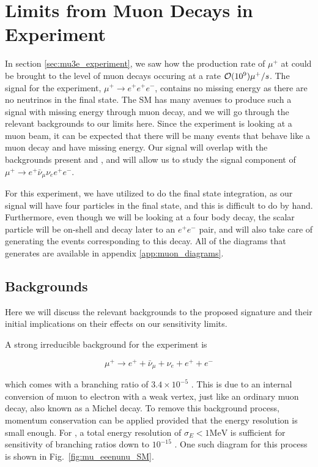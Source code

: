 \section{Limits from Muon Decays in \mueee Experiment}
In section \ref{sec:mu3e_experiment}, we saw how the production rate of $\mu^+$ at \mueee could be brought to the level of muon decays occuring at a rate $\operatorname{\mathcal{O}}(10^9) \mu^+/s$.
The signal for the \mueee experiment, $\mu^+ \rightarrow e^+ e^+ e^-$, contains no missing energy as there are no neutrinos in the final state.
The SM has many avenues to produce such a signal with missing energy through muon decay, and we will go through the relevant backgrounds to our limits here.
Since the experiment is looking at a muon beam, it can be expected that there will be many events that behave like a muon decay and have missing energy.
Our signal will overlap with the backgrounds present and \mueee, and will allow us to study the signal component of $\mu^+ \rightarrow e^+ \bar{\nu}_\mu \nu_e e^+ e^-$.

For this experiment, we have utilized \madgraph to do the final state integration, as our signal will have four particles in the final state, and this is difficult to do by hand.
Furthermore, even though we will be looking at a four body decay, the scalar particle will be on-shell and decay later to an $e^+ e^-$ pair, and \madgraph will also take care of generating the events corresponding to this decay.
All of the diagrams that \madgraph generates are available in appendix \ref{app:muon_diagrams}.

\subsection{Backgrounds}
Here we will discuss the relevant backgrounds to the proposed signature and their initial implications on their effects on our sensitivity limits.

A strong irreducible background for the experiment is

\begin{equation}
    \mu^+ \rightarrow e^+ + \bar{\nu}_\mu + \nu_e + e^+ + e^-
\end{equation}

\noindent which comes with a branching ratio of $3.4 \times 10^{-5}$ \cite{Agashe:2014kda}. 
This is due to an internal conversion of muon to electron with a weak vertex, just like an ordinary muon decay, also known as a Michel decay.
To remove this background process, momentum conservation can be applied provided that the energy resolution is small enough.
For \mueee, a total energy resolution of $\sigma_E < 1\textrm{MeV}$ is sufficient for sensitivity of branching ratios down to $10^{-15}$ \cite{Blondel:2013ia}.
One such diagram for this process is shown in Fig.\ \ref{fig:mu_eeenunu_SM}.

